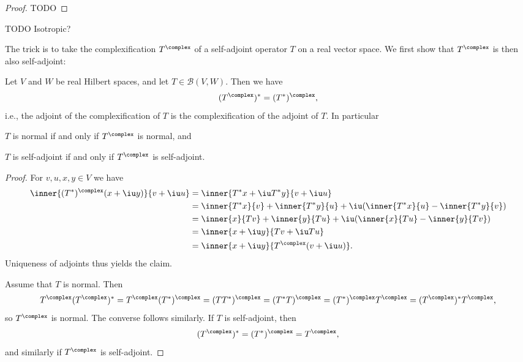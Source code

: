 \documentclass[a4paper, 11pt]{memoir}
\theoremstyle{plaincustomnumber}
\theoremstyle{changedotbreakcustomnumber}
\newcommand{\calB}{\mathcal{B}}
\begin{document}
\begin{proof}
    TODO
\end{proof}


\begin{proposition}
    TODO Isotropic?
\end{proposition}


\newpar

The trick is to take the complexification $T^\complex$ of a self-adjoint operator $T$ on a real vector space. We first show that $T^\complex$ is then also self-adjoint:

\begin{proposition}
    \label{prop:complexification-adjoint}
    Let $V$ and $W$ be real Hilbert spaces, and let $T \in \calB(V,W)$. Then we have
    \begin{equation*}
        (T^\complex)^*
            = (T^*)^\complex,
    \end{equation*}
    i.e., the adjoint of the complexification of $T$ is the complexification of the adjoint of $T$. In particular
    \begin{enumprop}
        \item $T$ is normal if and only if $T^\complex$ is normal, and
        \item $T$ is self-adjoint if and only if $T^\complex$ is self-adjoint.
    \end{enumprop}
\end{proposition}

\begin{proof}
    For $v,u,x,y \in V$ we have
    \begin{align*}
        \inner{(T^*)^\complex(x + \iu y)}{v + \iu u}
            &= \inner{ T^*x + \iu T^*y }{v + \iu u} \\
            &= \inner{T^*x}{v}
                + \inner{T^*y}{u}
                + \iu ( \inner{T^*x}{u} - \inner{T^*y}{v} ) \\
            &= \inner{x}{Tv}
                + \inner{y}{Tu}
                + \iu ( \inner{x}{Tu} - \inner{y}{Tv} ) \\
            &= \inner{x + \iu y}{Tv + \iu Tu} \\
            &= \inner{x + \iu y}{T^\complex(v + \iu u)}.
    \end{align*}
    Uniqueness of adjoints thus yields the claim.

    Assume that $T$ is normal. Then
    \begin{equation*}
        T^\complex (T^\complex)^*
            = T^\complex (T^*)^\complex
            = (TT^*)^\complex
            = (T^*T)^\complex
            = (T^*)^\complex T^\complex
            = (T^\complex)^* T^\complex,
    \end{equation*}
    so $T^\complex$ is normal. The converse follows similarly. If $T$ is self-adjoint, then
    \begin{equation*}
        (T^\complex)^*
            = (T^*)^\complex
            = T^\complex,
    \end{equation*}
    and similarly if $T^\complex$ is self-adjoint.
\end{proof}
\end{document}
